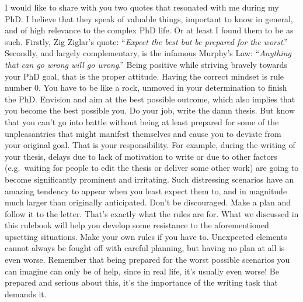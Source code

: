 \documentclass[
  12pt,
]{book}
\begin{document}
I would like to share with you two quotes that resonated with me during my PhD.
I believe that they speak of valuable things, important to know in general, and of high relevance to the complex PhD life.
Or at least I found them to be as such.
Firstly, Zig Ziglar's quote: ``\emph{Expect the best but be prepared for the worst}.''
Secondly, and largely complementary, is the infamous Murphy's Law: ``\emph{Anything that can go wrong will go wrong}.''
Being positive while striving bravely towards your PhD goal, that is the proper attitude.
Having the correct mindset is rule number 0.
You have to be like a rock, unmoved in your determination to finish the PhD.
Envision and aim at the best possible outcome, which also implies that you become the best possible you.
Do your job, write the damn thesis.
But know that you can't go into battle without being at least prepared for some of the unpleasantries that might manifest themselves and cause you to deviate from your original goal.
That is your responsibility.
For example, during the writing of your thesis, delays due to lack of motivation to write or due to other factors (e.g.~waiting for people to edit the thesis or deliver some other work) are going to become significantly prominent and irritating.
Such distressing scenarios have an amazing tendency to appear when you least expect them to, and in magnitude much larger than originally anticipated.
Don't be discouraged.
Make a plan and follow it to the letter.
That's exactly what the rules are for.
What we discussed in this rulebook will help you develop some resistance to the aforementioned upsetting situations.
Make your own rules if you have to.
Unexpected elements cannot always be fought off with careful planning, but having no plan at all is even worse.
Remember that being prepared for the worst possible scenarios you can imagine can only be of help, since in real life, it's usually even worse!
Be prepared and serious about this, it's the importance of the writing task that demands it.
\end{document}
